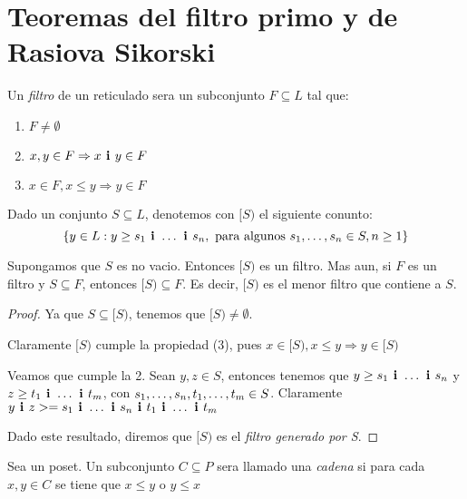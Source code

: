 \section{Teoremas del filtro primo y de Rasiova Sikorski}
\begin{definition}
  Un \emph{filtro} de un reticulado \reticulAlg sera un subconjunto $F \subseteq L$ tal que:
  \begin{enumerate}
    \item $F \neq \emptyset$
    \item $x, y \in F \Rightarrow \infbin{x}{y} \in F$
    \item $x \in F, x \leq y \Rightarrow y \in F$
  \end{enumerate}
\end{definition}

\begin{definition}
  Dado un conjunto $S \subseteq L$, denotemos con $[S)$ el siguiente conunto:
  $$
  \{y \in L : y \geq \succession[\textbf{ i }]{s}{1}{n}, \text{ para algunos } \succession{s}{1}{n} \in S, n \geq 1\}
  $$
\end{definition}
\begin{lemma}
  Supongamos que $S$ es no vacio. Entonces $[S)$ es un filtro. Mas aun, si $F$ es un filtro y $S \subseteq F$, entonces
  $[S) \subseteq F$. Es decir, $[S)$ es el menor filtro que contiene a $S$.
\end{lemma}
\begin{proof}
  Ya que $S \subseteq [S)$, tenemos que $[S) \neq \emptyset$.
  
  Claramente $[S)$ cumple la propiedad (3), pues $x \in [S), x\leq y \Rightarrow y \in [S)$

  Veamos que cumple la 2. Sean $y, z \in S$, entonces tenemos que $y \geq \succession[\textbf{ i }]{s}{1}{n}$ y
  $z \geq \succession[\textbf{ i }]{t}{1}{m}$, con $\succession{s}{1}{n}, \succession{t}{1}{m} \in S$. Claramente $\infbin{y}{z} >= \infbin{\succession[\textbf{ i }]{s}{1}{n}}{\succession[\textbf{ i }]{t}{1}{m}}$

  Dado este resultado, diremos que $[S)$ es el \emph{filtro generado por S}.
\end{proof}

\begin{definition}
  Sea \poset un poset. Un subconjunto $C \subseteq P$ sera llamado una \emph{cadena} si para cada
  $x, y \in C$ se tiene que $x \leq y$ o $y \leq x$
\end{definition}

